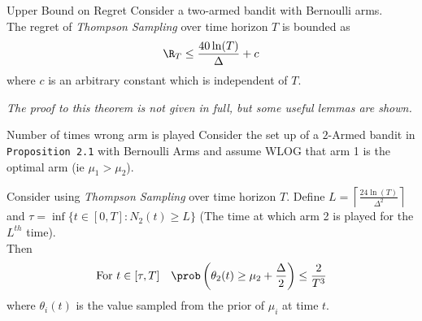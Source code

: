 \documentclass[11pt,a4paper]{article}
\begin{document}
  \begin{theorem}{Upper Bound on Regret}
    Consider a two-armed bandit with Bernoulli arms.\\
    The regret of \textit{Thompson Sampling} over time horizon $T$ is bounded as
    \[ \R_T\leq\frac{40\ln(T)}\Delta+c \]
    where $c$ is an arbitrary constant which is independent of $T$.
    \par\textit{The proof to this theorem is not given in full, but some useful lemmas are shown.}
  \end{theorem}

  \begin{theorem}{Number of times wrong arm is played}
    Consider the set up of a $2$-Armed bandit in \texttt{Proposition 2.1} with Bernoulli Arms and assume WLOG that arm 1 is the optimal arm (ie $\mu_1>\mu_2$).
    \par Consider using \textit{Thompson Sampling} over time horizon $T$. Define $L=\left\lceil\frac{24\ln(T)}{\Delta^2}\right\rceil$  and ${\tau=\inf\{t\in[0,T]:N_2(t)\geq L\}}$ (The time at which arm 2 is played for the $L^{th}$ time).\\ Then
    \[ \text{For }t\in[\tau,T]\quad\prob\left(\theta_2(t)\geq\mu_2+\frac\Delta2\right)\leq\frac2{T^3} \]
    where $\theta_i(t)$ is the value sampled from the prior of $\mu_i$ at time $t$.
  \end{theorem}
\end{document}
